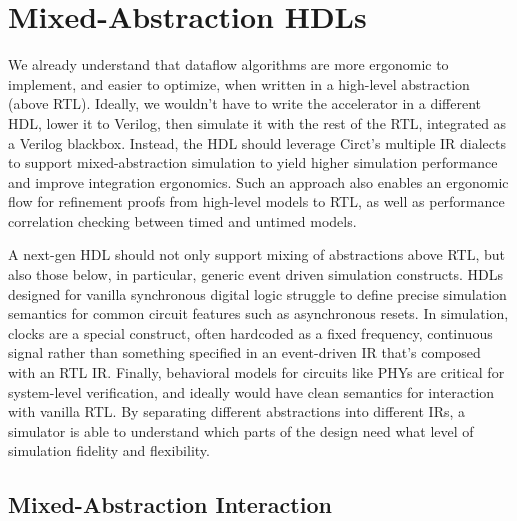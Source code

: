 \documentclass[sigplan,review,nonacm]{acmart}
\begin{document}
\section{Mixed-Abstraction HDLs}


We already understand that dataflow algorithms are more ergonomic to implement, and easier to optimize, when written in a high-level abstraction (above RTL).
Ideally, we wouldn't have to write the accelerator in a different HDL, lower it to Verilog, then simulate it with the rest of the RTL, integrated as a Verilog blackbox.
Instead, the HDL should leverage Circt's multiple IR dialects to support mixed-abstraction simulation to yield higher simulation performance and improve integration ergonomics\cite{pymtl3, esi}.
Such an approach also enables an ergonomic flow for refinement proofs from high-level models to RTL, as well as performance correlation checking between timed and untimed models.


A next-gen HDL should not only support mixing of abstractions above RTL, but also those below, in particular, generic event driven simulation constructs.
HDLs designed for vanilla synchronous digital logic struggle to define precise simulation semantics for common circuit features such as asynchronous resets.
In simulation, clocks are a special construct, often hardcoded as a fixed frequency, continuous signal rather than something specified in an event-driven IR that's composed with an RTL IR.
Finally, behavioral models for circuits\cite{llhd} like PHYs are critical for system-level verification, and ideally would have clean semantics for interaction with vanilla RTL.
By separating different abstractions into different IRs, a simulator is able to understand which parts of the design need what level of simulation fidelity and flexibility.

\subsection{Mixed-Abstraction Interaction}
\end{document}
